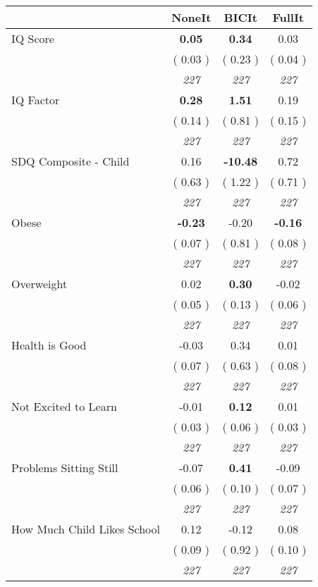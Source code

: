 \begin{tabular}{l c c c}
\toprule
 & NoneIt & BICIt & FullIt \\
\midrule
IQ Score & \textbf{      0.05 } & \textbf{      0.34 } &      0.03 \\
& (     0.03 ) & (     0.23 ) & (     0.04 ) \\
& \textit{ 227 } & \textit{ 227 } & \textit{ 227 } \\
IQ Factor & \textbf{      0.28 } & \textbf{      1.51 } &      0.19 \\
& (     0.14 ) & (     0.81 ) & (     0.15 ) \\
& \textit{ 227 } & \textit{ 227 } & \textit{ 227 } \\
SDQ Composite - Child &      0.16 & \textbf{    -10.48 } &      0.72 \\
& (     0.63 ) & (     1.22 ) & (     0.71 ) \\
& \textit{ 227 } & \textit{ 227 } & \textit{ 227 } \\
Obese & \textbf{     -0.23 } &     -0.20 & \textbf{     -0.16 } \\
& (     0.07 ) & (     0.81 ) & (     0.08 ) \\
& \textit{ 227 } & \textit{ 227 } & \textit{ 227 } \\
Overweight &      0.02 & \textbf{      0.30 } &     -0.02 \\
& (     0.05 ) & (     0.13 ) & (     0.06 ) \\
& \textit{ 227 } & \textit{ 227 } & \textit{ 227 } \\
Health is Good &     -0.03 &      0.34 &      0.01 \\
& (     0.07 ) & (     0.63 ) & (     0.08 ) \\
& \textit{ 227 } & \textit{ 227 } & \textit{ 227 } \\
Not Excited to Learn &     -0.01 & \textbf{      0.12 } &      0.01 \\
& (     0.03 ) & (     0.06 ) & (     0.03 ) \\
& \textit{ 227 } & \textit{ 227 } & \textit{ 227 } \\
Problems Sitting Still &     -0.07 & \textbf{      0.41 } &     -0.09 \\
& (     0.06 ) & (     0.10 ) & (     0.07 ) \\
& \textit{ 227 } & \textit{ 227 } & \textit{ 227 } \\
How Much Child Likes School &      0.12 &     -0.12 &      0.08 \\
& (     0.09 ) & (     0.92 ) & (     0.10 ) \\
& \textit{ 227 } & \textit{ 227 } & \textit{ 227 } \\
\bottomrule
\end{tabular}
